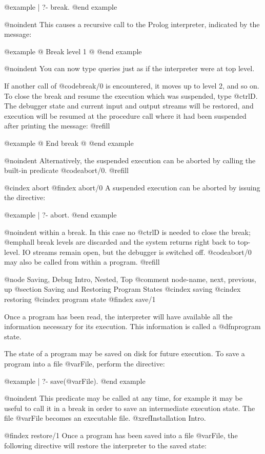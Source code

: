 @example
| ?- break.
@end example

@noindent
This causes a recursive call to the Prolog interpreter, indicated by the
message:

@example
@{ Break level 1 @}
@end example

@noindent
You can now type queries just as if the interpreter were at top level.

If another call of @code{break/0} is encountered, it moves up to level 2,
and so on.  To close the break and resume the execution which was
suspended, type @ctrl{D}.  The debugger state and current input and output
streams will be restored, and execution will be resumed at the procedure
call where it had been suspended after printing the message: @refill

@example
@{ End break @}
@end example

@noindent
Alternatively, the suspended execution can be aborted by calling the
built-in predicate @code{abort/0}.  @refill

@cindex abort
@findex abort/0
A suspended execution can be aborted by issuing the directive:  

@example
| ?- abort.
@end example

@noindent
within a break.  In this case no @ctrl{D} is needed to close the break;
@emph{all} break levels are discarded and the system returns right back
to top-level.  IO streams remain open, but the debugger is switched off.
@code{abort/0} may also be called from within a program. @refill

@node Saving, Debug Intro, Nested, Top
@comment  node-name,  next,  previous,  up
@section Saving and Restoring Program States
@cindex saving
@cindex restoring
@cindex program state
@findex save/1

Once a program has been read, the interpreter will have available all the
information necessary for its execution.  This information is called a
@dfn{program state}.

The state of a program may be saved on disk for future execution.  To
save a program into a file @var{File}, perform the directive:

@example
| ?- save(@var{File}).
@end example

@noindent
This predicate may be called at any time, for example it may be useful to
call it in a break in order to save an intermediate execution state.
The file @var{File} becomes an executable file. @xref{Installation Intro}.

@findex restore/1
Once a program has been saved into a file @var{File}, the following directive
will restore the interpreter to the saved state:

